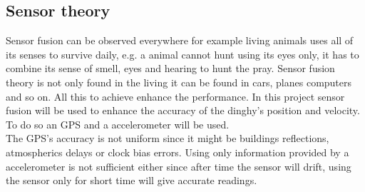 \subsection*{Sensor theory}
Sensor fusion can be observed everywhere for example living animals uses all of its senses to survive daily, e.g. a animal cannot hunt using its eyes only, it has to combine its sense of smell, eyes and hearing to hunt the pray. Sensor fusion theory is not only found in the living it can be found in cars, planes computers and so on. All this to achieve enhance the performance. In this project sensor fusion will be used to enhance the accuracy of the dinghy's position and velocity. To do so an GPS and a accelerometer will be used. \\ 
The GPS's accuracy is not uniform since it might be buildings reflections, atmospherics delays or clock bias errors. Using only information provided by a accelerometer is not sufficient either since after time the sensor will drift, using the sensor only for short time will give accurate readings.  


